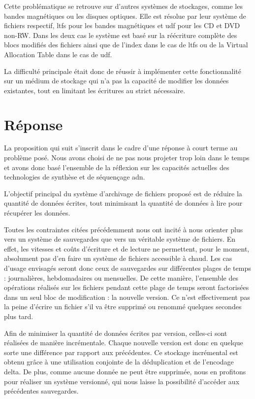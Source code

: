 \documentclass[a4paper]{report}
\begin{document}
Cette problématique se retrouve sur d'autres systèmes de stockages, comme les bandes magnétiques ou les disques optiques.
Elle est résolue par leur système de fichiers respectif, \ac{ltfs} \cite{pease2010linear} pour les bandes magnétiques et \ac{udf} \cite{optical2003universal} pour les CD et DVD non-RW.
Dans les deux cas le système est basé sur la réécriture complète des blocs modifiés des fichiers ainsi que de l'index dans le cas de \ac{ltfs} ou de la Virtual Allocation Table dans le cas de \ac{udf}.


La difficulté principale était donc de réussir à implémenter cette fonctionnalité sur un médium de stockage qui n'a pas la capacité de modifier les données existantes, tout en limitant les écritures au strict nécessaire.


\section{Réponse}

La proposition qui suit s'inscrit dans le cadre d'une réponse à court terme au problème posé.
Nous avons choisi de ne pas nous projeter trop loin dans le temps et avons donc basé l'ensemble de la réflexion sur les capacités actuelles des technologies de synthèse et de séquençage \ac{adn}.

L'objectif principal du système d'archivage de fichiers proposé est de réduire la quantité de données écrites, tout minimisant la quantité de données à lire pour récupérer les données.

Toutes les contraintes citées précédemment nous ont incité %
à nous orienter plus vers un système de sauvegardes que vers un véritable système de fichiers.
En effet, les vitesses et coûts d'écriture et de lecture ne permettent, pour le moment, absolument pas d'en faire un système de fichiers accessible à chaud.
Les cas d'usage envisagés seront donc ceux de sauvegardes sur différentes plages de temps : journalières, hebdomadaires ou mensuelles.
De cette manière, l'ensemble des opérations réalisés sur les fichiers pendant cette plage de temps seront factorisées dans un seul bloc de modification : la nouvelle version.
Ce n'est effectivement pas la peine d'écrire un fichier s'il va être supprimé ou renommé quelques secondes plus tard.

Afin de minimiser la quantité de données écrites par version, celles-ci sont réalisées de manière incrémentale.
Chaque nouvelle version est donc en quelque sorte une différence par rapport aux précédentes.
Ce stockage incrémental est obtenu grâce à une utilisation conjointe de la déduplication et de l'encodage delta.
De plus, comme aucune donnée ne peut être supprimée, nous en profitons pour réaliser un système versionné, qui nous laisse la possibilité d'accéder aux précédentes sauvegardes.
\end{document}
